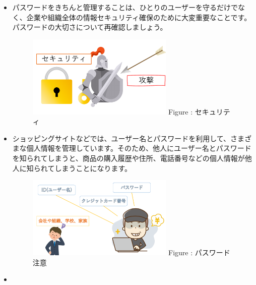 \documentclass[a4paper,12pt]{jarticle}
\begin{document}
\begin{enumerate}
        
        \clearpage
        \begin{itemize}
        \item
        パスワードをきちんと管理することは、ひとりのユーザーを守るだけでなく、企業や組織全体の情報セキュリティ確保のために大変重要なことです。パスワードの大切さについて再確認しましょう。
        \begin{figure}[h]
          \centering
          \begin{minipage}{5.228cm}
            {\upshape
              \includegraphics[width=7.000cm]{pswd_image_imp7.pdf}
              \newline
              Figure {\theFigure\label{seq:refFigure20}}:
              セキュリティ}
          \end{minipage}
        \end{figure}
        \item
        ショッピングサイトなどでは、ユーザー名とパスワードを利用して、さまざまな個人情報を管理しています。そのため、他人にユーザー名とパスワードを知られてしまうと、商品の購入履歴や住所、電話番号などの個人情報が他人に知られてしまうことになります。
        \begin{figure}[h]
          \centering
          \begin{minipage}{5.228cm}
            {\upshape
              \includegraphics[width=7.000cm]{pswd_image_imp2.pdf}
              \newline
              Figure {\theFigure\label{seq:refFigure24}}:
              パスワード注意}
          \end{minipage}
        \end{figure}
        \item

\end{itemize}
\end{enumerate}
\end{document}
